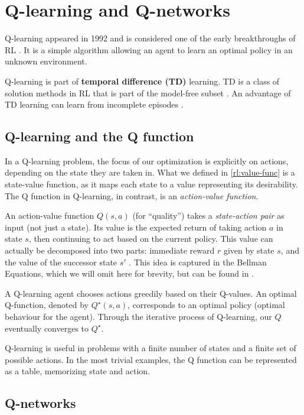\section{Q-learning and Q-networks}

Q-learning \cite{Watkins1992} appeared in 1992 and is considered one of the early breakthroughs of RL \cite{rlai}.
It is a simple algorithm allowing an agent to learn an optimal policy in an unknown environment.

Q-learning is part of \textbf{temporal difference (TD)} learning.
TD is a class of solution methods in RL that is part of the model-free subset \cite{rlai}.
An advantage of TD learning can learn from incomplete episodes \cite{long-peak-rl}.

\subsection{Q-learning and the Q function}
In a Q-learning problem, the focus of our optimization is explicitly on actions, depending on the state they are taken in.
What we defined in \ref{rl:value-func} is a state-value function, as it maps each state to a value representing its desirability.
The Q function in Q-learning, in contrast, is an \emph{action-value function}.

An action-value function \(Q(s, a)\) (for ``quality'') takes a \emph{state-action pair} as input (not just a state).
Its value is the expected return of taking action \(a\) in state \(s\), then continuing to act based on the current policy.
This value can actually be decomposed into two parts: immediate reward \(r\) given by state \(s\), and the value of the successor state \({s}'\) \cite{silver-lectures}.
This idea is captured in the Bellman Equations, which we will omit here for brevity, but can be found in \cite{rlai, silver-lectures}.

A Q-learning agent chooses actions greedily based on their Q-values.
An optimal Q-function, denoted by  \(Q^{\star}(s, a)\), corresponds to an optimal policy (optimal behaviour for the agent).
Through the iterative process of Q-learning, our \(Q\) eventually converges to \(Q^{\star}\).

Q-learning is useful in problems with a finite number of states and a finite set of possible actions.
In the most trivial examples, the Q function can be represented as a table, memorizing state and action.

\subsection{Q-networks}

